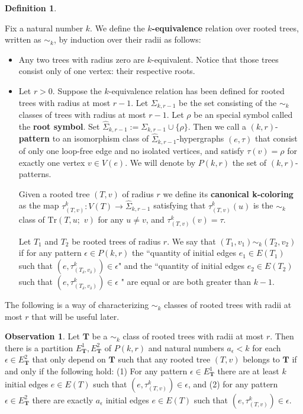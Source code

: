 \documentclass[12pt,notitlepage,a4paper]{article}
\theoremstyle{definition}
\newtheorem{obs}{Observation}[section]
\newtheorem{definition}{Definition}[section]
\begin{document}
\begin{definition}\label{def:sim_trees}
	 
	Fix a natural number $k$. We define the
	\textbf{$k$-equivalence} relation over rooted trees, 
	written as $\sim_k$, by induction over their radii as follows:
	
	\begin{itemize}[leftmargin=*]
		\item Any two trees with radius zero are $k$-equivalent.
		Notice that those trees
		consist only of one vertex: their respective roots.
		
		\item Let $r>0$.
		Suppose the $k$-equivalence relation has been
		defined for rooted trees with radius at most $r-1$. Let $\Sigma_{k,r-1}$
		be the set consisting of the $\sim_k$ classes of trees
		with radius at most $r-1$. Let $\rho$ be an special symbol called the
		\textbf{root symbol}. Set $\widehat{\Sigma}_{k,r-1}:=\Sigma_{k,r-1}\cup \{\rho\}$.
		Then we call a $(k,r)$-\textbf{pattern} to an isomorphism class
		of $\widehat{\Sigma}_{k,r-1}$-hypergraphs 
		$(e,\tau)$ that consist of only one loop-free edge and no isolated vertices,
		and satisfy 
		$\tau(v)=\rho$ for exactly one vertex $v\in V(e)$. We will
		denote by $P(k,r)$ the set of $(k,r)$-patterns. \par
		Given a rooted tree $(T,v)$ of radius $r$
		we define its \textbf{canonical k-coloring}
		as the map 
		$\tau^k_{(T,v)}: V(T)\rightarrow \widehat{\Sigma}_{k,r-1}$ satisfying that
		$\tau^k_{(T,v)}(u)$ is the
		$\sim_k$ class of $\mathrm{Tr}(T,u;\, \,v)$
		for any $u\neq v$, and $\tau^k_{(T,v)}(v)=\tau$. \par
		Let $T_1$ and $T_2$ be rooted trees of radius $r$. 
		We say that $(T_1,v_1)\sim_k (T_2,v_2)$ 
		if for any pattern $\epsilon\in P(k,r)$	the
		``quantity of initial edges $e_1\in E(T_1)$ such that
		$(e,\tau^k_{(T_\delta,v_\delta)}) \in \epsilon$" 
		and the
		``quantity of initial edges $e_2\in E(T_2)$ such that
		$(e,\tau^k_{(T_\delta,v_\delta)})\in \epsilon$
		" are equal or
		are both greater than $k-1$.
	\end{itemize}
	
\end{definition}

The following is a way of characterizing $\sim_k$ classes
of rooted trees with radii at most $r$ that will be useful later. 

\begin{obs}\label{obs:equivalenttrees}
	Let $\mathbf{T}$ be a $\sim_k$ class of rooted trees with
	radii at most $r$. Then there is a partition $E^1_\mathbf{T},
	E^2_\mathbf{T}$ of $P(k,r)$ and natural numbers $a_\epsilon<k$
	for each $\epsilon\in E^2_\mathbf{T}$ that only depend on 
	$\mathbf{T}$ such that any rooted tree $(T,v)$ belongs to
	$\mathbf{T}$ if and only if the following hold: (1) For any pattern 
	$\epsilon\in E^1_\mathbf{T}$ there are at least $k$ initial edges $e\in E(T)$ such that
	$(e,\tau^k_{(T,v)})\in \epsilon$, and (2) for any pattern 
	$\epsilon\in E^2_\mathbf{T}$ there are exactly
	$a_\epsilon$ initial edges $e\in E(T)$ such that
	$(e,\tau^k_{(T,v)})\in \epsilon$.	
\end{obs}
\end{document}
